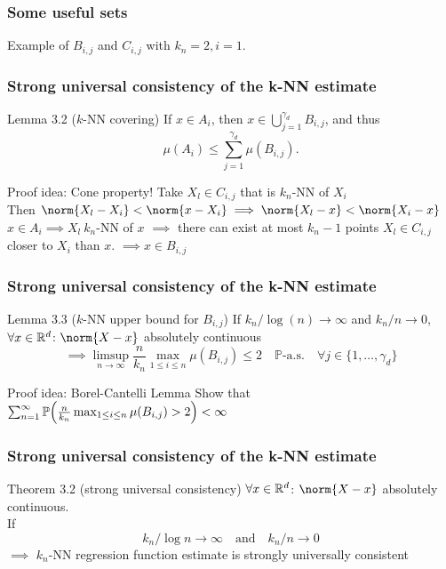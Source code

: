\begin{frame}
\frametitle{Some useful sets}
Example of \(B_{i, j}\) and \(C_{i, j}\) with \(k_n = 2, i = 1\).
\begin{figure}[htbp]
  \centering
  
\end{figure}
\end{frame}


\begin{frame}
\frametitle{Strong universal consistency of the k-NN estimate}
\begin{block}{Lemma 3.2 (\(k\)-NN covering)}
If \(x \in A_i\), then \(x \in \bigcup_{j=1}^{\gamma_d} B_{i,j}\), and thus
\[
    \mu(A_i) \leq \sum_{j=1}^{\gamma_d}\mu(B_{i,j}).
\]
\end{block}

\begin{exampleblock}{Proof idea: Cone property!}
Take \(X_l \in C_{i, j}\) that is \(k_n\)-NN of \(X_i\) \\
Then \(\norm{X_l - X_i} < \norm{x - X_i} \implies \norm{X_l - x}< \norm{X_i - x}\) \\
\(x \in A_i \implies X_l \ k_n\)-NN of \(x\)
\(\implies\) there can exist at most \(k_n - 1\) points \(X_l \in C_{i, j}\) closer to \(X_i\) than \(x\).
\(\implies x \in B_{i, j}\)
\end{exampleblock}
\end{frame}

\begin{frame}
\frametitle{Strong universal consistency of the k-NN estimate}
\begin{block}{Lemma 3.3 (\(k\)-NN upper bound for \(B_{i, j}\))}
If \(k_n / \log(n) \to \infty\) and \(k_n / n \to 0\),
\(\forall x \in \mathbb{R}^d\): \(\norm{X - x}\) absolutely continuous
\[
    \implies \limsup_{n \to \infty} \frac{n}{k_n}\max_{1 \leq i \leq n} \mu(B_{i, j}) \leq 2 \quad \text{\(\mathbb{P}\)-a.s.} \quad  \forall j \in \{1, \ldots, \gamma_d\}
\]
\end{block}

\begin{exampleblock}{Proof idea: Borel-Cantelli Lemma}
Show that \(\sum_{n=1}^\infty \pro{\frac{n}{k_n}\max_{1 \leq i \leq n} \mu(B_{i, j}) > 2} < \infty\)
\end{exampleblock}

\end{frame}

\begin{frame}
\frametitle{Strong universal consistency of the k-NN estimate}
\begin{alertblock}{Theorem 3.2 (strong universal consistency)}
\(\forall x \in \mathbb{R}^d\): \(\norm{X - x}\) absolutely continuous. \\
If  \[k_n / \log n \to \infty \quad \text{and} \quad k_n / n \to 0\]
\(\implies\)  \(k_n\)-NN regression function estimate is strongly universally consistent
\end{alertblock}
\end{frame}

